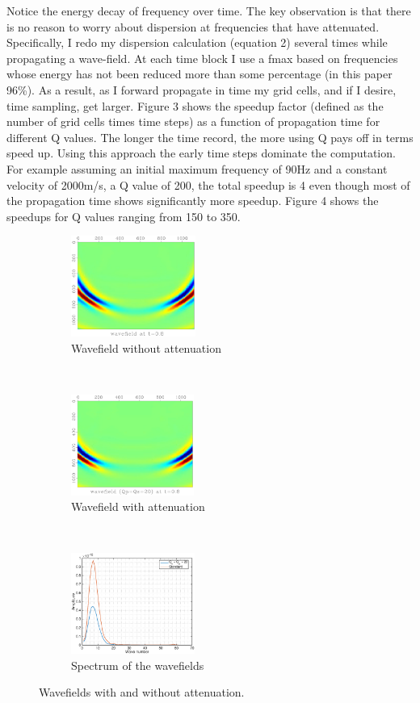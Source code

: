 \documentclass{paris17}
\begin{document}
Notice the energy decay of frequency over time. The key observation is that there is no reason to worry about dispersion at frequencies that have attenuated. Specifically, I redo my dispersion calculation (equation 2) several times while propagating a wave-field. At each time block I use a fmax based on frequencies whose energy has not been reduced more than some percentage (in this paper 96\%). As a result, as I forward propagate in time my grid cells, and if I desire, time sampling, get larger. Figure 3 shows the speedup factor (defined as the number of grid cells times time steps) as a function of propagation time for different Q values. The longer the time record, the more using Q pays off in terms speed up. Using this approach the early time steps dominate the computation. For example assuming an initial maximum frequency of 90Hz and a constant velocity of 2000m/s, a Q value of 200, the total speedup is 4 even though most of the propagation time shows significantly more speedup. Figure 4 shows the speedups for Q values ranging from 150 to 350.

\begin{figure}[h]
    \centering
    \begin{subfigure}[b]{0.3\textwidth}
        \centering
        \includegraphics[height=1.3in]{./fig/std.pdf}
        \caption{Wavefield without attenuation}
    \end{subfigure}%
    ~
    \begin{subfigure}[b]{0.3\textwidth}
        \centering
        \includegraphics[height=1.3in]{./fig/q20.pdf}
        \caption{Wavefield with attenuation}
    \end{subfigure}
    ~
    \begin{subfigure}[b]{0.3\textwidth}
        \centering
        \includegraphics[height=1.3in]{./fig/spec.eps}
        \caption{Spectrum of the wavefields}
    \end{subfigure}
    \caption{Wavefields with and without attenuation.}
\end{figure}
\end{document}

